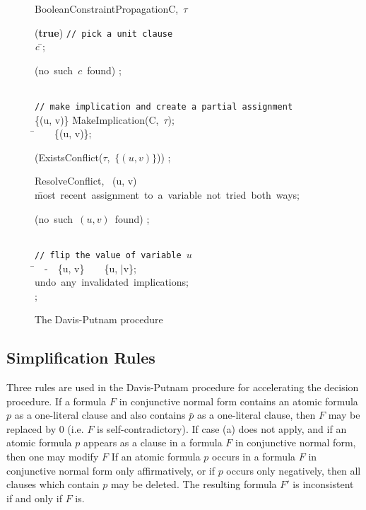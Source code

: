\begin{figure}[hbt!]
{\begin{minipage}{7cm}
\begin{algorithm}{\sc{}BooleanConstraintPropagation}{\mbox{C, $\tau$}}
\begin{WHILE}{(\mbox{\bf{}true})}
    \mbox{\tt{}// pick a unit clause}\\
    \mbox{\em{}c} \= \mbox{};\\
    \begin{IF}{(\mbox{no such $c$ found})}
      ;
    \end{IF}\\
    \mbox{\tt{}// make implication and create a partial assignment}\\
    \{(u, v)\} \= \mbox{\sc{}MakeImplication(C, $\tau$)};\\
    \tau \= \tau\ \ \cup\ \ \{(u, v)\};\\
    \begin{IF}{(\mbox{\sc{}ExistsConflict($\tau$, $\{(u, v)\}$)})}
      ;
    \end{IF}
  \end{WHILE}
\end{algorithm}
%
\begin{algorithm}{\sc{}ResolveConflict}{\tau,\ \Gamma}
  (u, v) \= \mbox{most recent assignment to a variable not tried both ways};\\
  \begin{IF}{\mbox{(no such $(u, v)$ found)}}
    ;
  \end{IF}\\
  \mbox{\tt{}// flip the value of variable $u$}\\
  \tau \= \tau\ \ -\ \ \{u, v\}\ \ \cup\ \ \{u, \bar{v}\};\\
  \mbox{undo any invalidated implications};\\
  ;
\end{algorithm}
\end{minipage}}

\caption{The Davis-Putnam procedure}\label{alg:davis-putnam}
\end{figure}

\subsection{Simplification Rules}
Three rules are used in the Davis-Putnam procedure for accelerating the
decision procedure.
\ben
\w {}
  \ben
  \w If a formula $F$ in conjunctive normal form contains an atomic 
     formula $p$ as a one-literal clause and also contains $\bar{p}$ as a 
     one-literal clause, then $F$ may be replaced by 0 (i.e. $F$ is
     self-contradictory).
  \w If case (a) does not apply, and if an atomic formula $p$ appears as 
     a clause in a formula $F$ in conjunctive normal form, then one may 
     modify $F$
  \een
\w {}
  If an atomic formula $p$ occurs in a formula $F$ in conjunctive normal 
  form only affirmatively, or if $p$ occurs only negatively, then all 
  clauses which contain $p$ may be deleted. The resulting formula $F'$ is
  inconsistent if and only if $F$ is.
\w {}
\een




